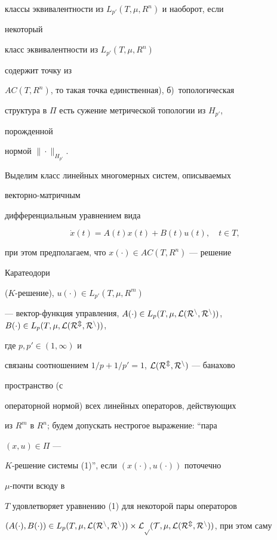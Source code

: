 классы эквивалентности из $L_{p'}(T,\mu,R^n)$ и наоборот, если 


некоторый 


класс эквивалентности из $L_{p'}(T,\mu,R^n)$ 


содержит точку из 


$AC(T,R^n)$, то такая точка единственная), б)~топологическая 


структура в $\Pi$ есть сужение метрической топологии из $H_{p'}$, 


порожденной 


нормой $\|\cdot\|_{H_{p'}}$. 


 


Выделим класс линейных многомерных систем, описываемых 


векторно-матричным 


дифференциальным уравнением вида 


\begin{equation} 


\Dot x(t)=A(t)x(t)+B(t)u(t),\quad t\in T, 


\end{equation} 


при этом предполагаем, что $x(\cdot)\in AC(T,R^n)$ --- решение 


Каратеодори 


($K$-решение), $u(\cdot)\in L_{p'}(T,\mu,R^m)$ 


--- вектор-функция управления, $A(\cdot)\in L_p(T,\mu,\cal 


L(R^n,R^n))$, $B(\cdot)\in L_p(T,\mu,\cal L(R^m,R^n))$, 


где $p,p'\in(1,\infty)$ и 


связаны соотношением $1/p+1/p'=1$, $\cal L(R^m,R^n)$ --- банахово 


пространство (с 


операторной нормой) всех линейных операторов, действующих 


из $R^m$ в $R^n$; будем допускать нестрогое выражение: ``пара 


$(x,u)\in\Pi$ --- 


$K$-решение системы (1)'', если $(x(\cdot),u(\cdot))$ поточечно 


$\mu$-почти всюду в 


$T$ удовлетворяет уравнению (1) для некоторой пары операторов 


$(A(\cdot),B(\cdot))\in L_p(T,\mu,\cal L(R^n,R^n))\times L_p(T,\mu,\cal 


L(R^m,R^n))$, при этом саму 


